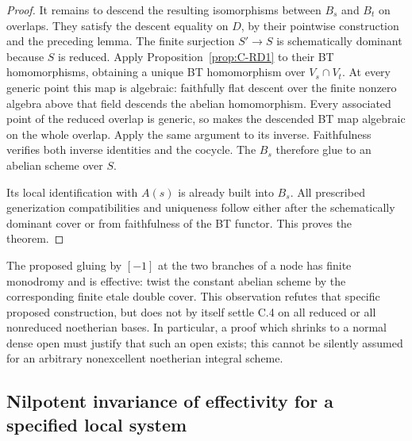 \begin{proof}
It remains to descend the resulting isomorphisms between $B_s$ and
$B_t$ on overlaps. They satisfy the descent equality on $D$, by their
pointwise construction and the preceding lemma. The finite surjection
$S'\to S$ is schematically dominant because $S$ is reduced. Apply
Proposition~\ref{prop:C-RD1} to their BT homomorphisms, obtaining a
unique BT homomorphism over $V_s\cap V_t$. At every generic point
this map is algebraic: faithfully flat descent over the finite
nonzero algebra above that field descends the abelian homomorphism.
Every associated point of the reduced overlap is generic, so
\cite[Proposition~1.2, p.64]{Grothendieck1966Hom} makes the descended
BT map algebraic on the whole overlap. Apply the same argument to its
inverse. Faithfulness verifies both inverse identities and the
cocycle. The $B_s$ therefore glue to an abelian scheme over $S$.

Its local identification with $A(s)$ is already built into $B_s$.
All prescribed generization compatibilities and uniqueness follow
either after the schematically dominant cover or from faithfulness
of the BT functor. This proves the theorem.
\end{proof}

\begin{remark}
The proposed gluing by $[-1]$ at the two branches of a node has finite
monodromy and is effective: twist the constant abelian scheme by the
corresponding finite etale double cover. This observation refutes that
specific proposed construction, but does not by itself settle C.4 on
all reduced or all nonreduced noetherian bases. In particular, a proof
which shrinks to a normal dense open must justify that such an open
exists; this cannot be silently assumed for an arbitrary nonexcellent
noetherian integral scheme.
\end{remark}

\subsection{Nilpotent invariance of effectivity for a specified local system}

